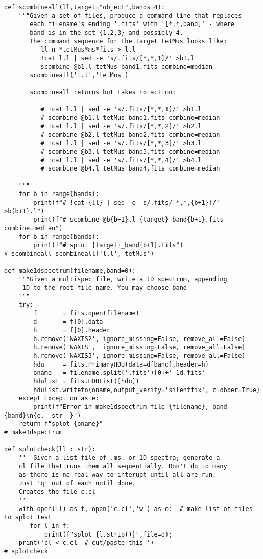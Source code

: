 {\begin{verbatim}
def scombineall(ll,target="object",bands=4):
    """Given a set of files, produce a command line that replaces
       each filename's ending '.fits' with '[*,*,band]' - where
       band is in the set {1,2,3} and possibly 4.
       The command sequence for the target tetMus looks like:
          ll n_*tetMus*ms*fits > l.l
          !cat l.l | sed -e 's/.fits/[*,*,1]/' >b1.l
          scombine @b1.l tetMus_band1.fits combine=median
       scombineall('l.l','tetMus')

       scombineall returns but takes no action:

          # !cat l.l | sed -e 's/.fits/[*,*,1]/' >b1.l
          # scombine @b1.l tetMus_band1.fits combine=median
          # !cat l.l | sed -e 's/.fits/[*,*,2]/' >b2.l
          # scombine @b2.l tetMus_band2.fits combine=median
          # !cat l.l | sed -e 's/.fits/[*,*,3]/' >b3.l
          # scombine @b3.l tetMus_band3.fits combine=median
          # !cat l.l | sed -e 's/.fits/[*,*,4]/' >b4.l
          # scombine @b4.l tetMus_band4.fits combine=median

    """
    for b in range(bands):
        print(f"# !cat {ll} | sed -e 's/.fits/[*,*,{b+1}]/' >b{b+1}.l")
        print(f"# scombine @b{b+1}.l {target}_band{b+1}.fits combine=median")
    for b in range(bands):
        print(f"# splot {target}_band{b+1}.fits")
# scombineall scombineall('l.l','tetMus')

def make1dspectrum(filename,band=0):
    """Given a multispec file, write a 1D spectrum, appending
    _1D to the root file name. You may choose band
    """
    try:
        f       = fits.open(filename)
        d       = f[0].data
        h       = f[0].header
        h.remove('NAXIS2', ignore_missing=False, remove_all=False)
        h.remove('NAXIS',  ignore_missing=False, remove_all=False)
        h.remove('NAXIS3', ignore_missing=False, remove_all=False)
        hdu     = fits.PrimaryHDU(data=d[band],header=h)
        oname   = filename.split('.fits')[0]+'_1d.fits'
        hdulist = fits.HDUList([hdu])
        hdulist.writeto(oname,output_verify='silentfix', clobber=True)
    except Exception as e:
        print(f"Error in make1dspectrum file {filename}, band {band}\n{e.__str__}")
    return f"splot {oname}"
# make1dspectrum

def splotcheck(ll : str):
    ''' Given a list file of .ms. or 1D spectra; generate a
    cl file that runs them all sequentially. Don't do to many
    as there is no real way to interupt until all are run.
    Just 'q' out of each until done.
    Creates the file c.cl
    '''
    with open(ll) as f, open('c.cl','w') as o:  # make list of files to splot test
       for l in f:
           print(f"splot {l.strip()}",file=o);
    print('cl < c.cl  # cut/paste this ')
# splotcheck


\end{verbatim}}

